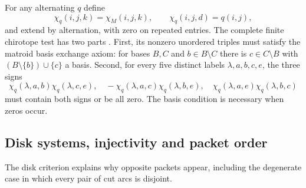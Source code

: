 For any alternating $q$ define
\begin{equation}\label{eq:polygon-combined}
 \chi_q(i,j,k)=\chi_M(i,j,k),\qquad
 \chi_q(i,j,d)=q(i,j),
\end{equation}
and extend by alternation, with zero on repeated entries.
The complete finite chirotope test has two parts
\cite[Section~7.2.3, p.~10]{RGZ}.
First, its nonzero unordered triples must satisfy the matroid basis
exchange axiom: for bases $B,C$ and $b\in B\setminus C$ there is
$c\in C\setminus B$ with $(B\setminus\{b\})\cup\{c\}$ a basis.
Second, for every five distinct labels $\lambda,a,b,c,e$, the three
signs
\begin{equation}\label{eq:polygon-gp}
 \chi_q(\lambda,a,b)\chi_q(\lambda,c,e),\quad
 -\chi_q(\lambda,a,c)\chi_q(\lambda,b,e),\quad
 \chi_q(\lambda,a,e)\chi_q(\lambda,b,c)
\end{equation}
must contain both signs or be all zero. The basis condition is
necessary when zeros occur.

\subsection{Disk systems, injectivity and packet order}
The disk criterion explains why opposite packets appear, including
the degenerate case in which every pair of cut arcs is disjoint.

